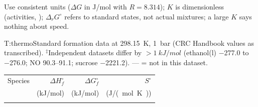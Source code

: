 \begin{multicols}{2}
\begin{trapbox}Use consistent units ($\Delta G$ in J/mol with $R=8.314$); $K$ is dimensionless (activities, ); $\Delta_rG^\circ$ refers to standard states, not actual mixtures; a large $K$ says nothing about speed.\end{trapbox}

\begin{reftab}{T:thermo}{Standard formation data at \SI{298.15}{K}, \SI{1}{bar} (CRC Handbook values as transcribed). $^\ddagger$Independent datasets differ by $>\SI{1}{kJ/mol}$ (ethanol(l) \num{-277.0} to \num{-276.0}; NO \numrange{90.3}{91.1}; sucrose \num{-2221.2}). --- = not in this dataset.}
\small
\begin{tabularx}{\linewidth}{@{}Yrrr@{}}
\toprule
Species & $\Delta H_f^\circ$ & $\Delta G_f^\circ$ & $S^\circ$\\
 & (\si{kJ/mol}) & (\si{kJ/mol}) & (\si{J/(mol.K)})\\
\midrule
{}
\bottomrule
\end{tabularx}\end{reftab}
\end{multicols}

